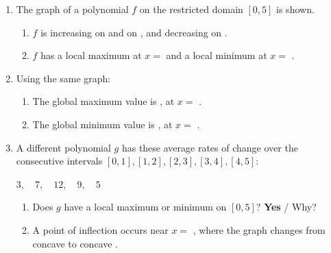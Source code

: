 \documentclass[10pt]{article}
\begin{document}

\vspace{0.12in}

\begin{enumerate}[itemsep=10pt]

\item The graph of a polynomial $f$ on the restricted domain $[0, 5]$ is
      shown.

\begin{center}
\end{center}

\begin{enumerate}[label=(\alph*), itemsep=4pt]
  \item $f$ is increasing on  and on  , and
        decreasing on  .
  \item $f$ has a local maximum at $x = $  and a local
        minimum at $x = $  .
\end{enumerate}

\item Using the same graph:

\begin{enumerate}[label=(\alph*), itemsep=4pt]
  \item The global maximum value is  , at $x = $
         .
  \item The global minimum value is  , at $x = $
         .
\end{enumerate}

\item A different polynomial $g$ has these average rates of change over the
      consecutive intervals $[0,1], [1,2], [2,3], [3,4], [4,5]$:

      \begin{center}
      $3,\quad 7,\quad 12,\quad 9,\quad 5$
      \end{center}

\begin{enumerate}[label=(\alph*), itemsep=4pt]
  \item Does $g$ have a local maximum or minimum on $[0, 5]$? \quad
        \textbf{Yes} /  \quad Why? 
  \item A point of inflection occurs near $x = $  , where the
        graph changes from concave  to concave  .
\end{enumerate}

\end{enumerate}
\end{document}
